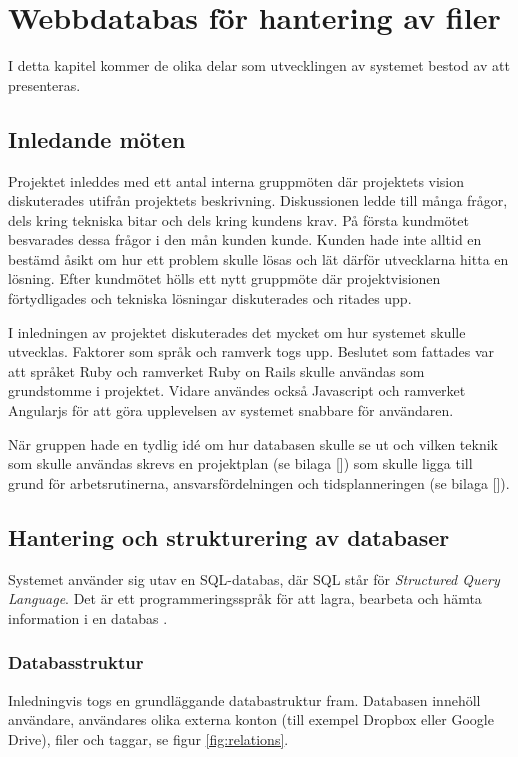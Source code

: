 \chapter{Webbdatabas för hantering av filer}
I detta kapitel kommer de olika delar som utvecklingen av systemet bestod av att presenteras.

\section{Inledande möten}
Projektet inleddes med ett antal interna gruppmöten där projektets vision diskuterades utifrån projektets beskrivning. Diskussionen ledde till många frågor, dels kring tekniska bitar och dels kring kundens krav. På första kundmötet besvarades dessa frågor i den mån kunden kunde. Kunden hade inte alltid en bestämd åsikt om hur ett problem skulle lösas och lät därför utvecklarna hitta en lösning. Efter kundmötet hölls ett nytt gruppmöte där projektvisionen förtydligades och tekniska lösningar diskuterades och ritades upp.

I inledningen av projektet diskuterades det mycket om hur systemet skulle utvecklas. Faktorer som språk och ramverk togs upp. Beslutet som fattades var att språket Ruby och ramverket Ruby on Rails skulle användas som grundstomme i projektet. Vidare användes också Javascript och ramverket Angularjs för att göra upplevelsen av systemet snabbare för användaren.

När gruppen hade en tydlig idé om hur databasen skulle se ut och vilken teknik som skulle användas skrevs en projektplan (se bilaga []) som skulle ligga till grund för arbetsrutinerna, ansvarsfördelningen och tidsplanneringen (se bilaga []).

\section{Hantering och strukturering av databaser}
Systemet använder sig utav en SQL-databas, där SQL står för \textit{Structured Query Language}. Det är ett programmeringsspråk för att lagra, bearbeta och hämta information i en databas \cite{sqlenc}.

\subsection{Databasstruktur}
Inledningvis togs en grundläggande databastruktur fram. Databasen innehöll användare, användares olika externa konton (till exempel Dropbox eller Google Drive), filer och taggar, se figur \ref{fig:relations}.

